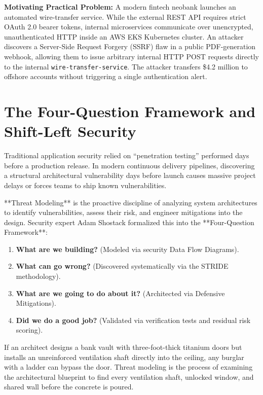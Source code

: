 \begin{chaptergoalsbox}
\textbf{Motivating Practical Problem:}
A modern fintech neobank launches an automated wire-transfer service. While the external REST API requires strict OAuth 2.0 bearer tokens, internal microservices communicate over unencrypted, unauthenticated HTTP inside an AWS EKS Kubernetes cluster. An attacker discovers a Server-Side Request Forgery (SSRF) flaw in a public PDF-generation webhook, allowing them to issue arbitrary internal HTTP POST requests directly to the internal \texttt{wire-transfer-service}. The attacker transfers \$4.2 million to offshore accounts without triggering a single authentication alert.
\end{chaptergoalsbox}

\section{The Four-Question Framework and Shift-Left Security}

Traditional application security relied on ``penetration testing'' performed days before a production release. In modern continuous delivery pipelines, discovering a structural architectural vulnerability days before launch causes massive project delays or forces teams to ship known vulnerabilities.

**Threat Modeling** is the proactive discipline of analyzing system architectures to identify vulnerabilities, assess their risk, and engineer mitigations into the design. Security expert Adam Shostack formalized this into the **Four-Question Framework**:

\begin{enumerate}[leftmargin=18pt]
  \item \textbf{What are we building?} (Modeled via security Data Flow Diagrams).
  \item \textbf{What can go wrong?} (Discovered systematically via the STRIDE methodology).
  \item \textbf{What are we going to do about it?} (Architected via Defensive Mitigations).
  \item \textbf{Did we do a good job?} (Validated via verification tests and residual risk scoring).
\end{enumerate}

\begin{intuitionbox}
If an architect designs a bank vault with three-foot-thick titanium doors but installs an unreinforced ventilation shaft directly into the ceiling, any burglar with a ladder can bypass the door. Threat modeling is the process of examining the architectural blueprint to find every ventilation shaft, unlocked window, and shared wall before the concrete is poured.
\end{intuitionbox}

